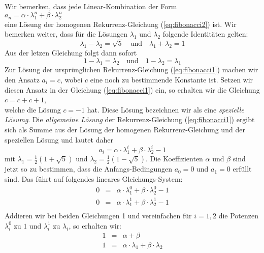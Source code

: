 Wir bemerken, dass jede Linear-Kombination der Form
\\[0.2cm]
\hspace*{1.3cm}
$a_n = \alpha \cdot \lambda_1^n + \beta \cdot \lambda_2^n$
\\[0.2cm]
eine L\"{o}sung der homogenen Rekurrenz-Gleichung (\ref{eq:fibonacci2}) ist.
Wir bemerken weiter, dass f\"{u}r die L\"{o}sungen $\lambda_1$ und $\lambda_2$ folgende
Identit\"{a}ten gelten:
\begin{equation}
  \label{eq:fibonacci3}
   \lambda_1 - \lambda_2 = \sqrt{5} \quad \mbox{und} \quad \lambda_1 + \lambda_2 = 1
\end{equation}
Aus der letzen Gleichung folgt dann sofort 
\begin{equation}
  \label{eq:fibonacci4}
  1 - \lambda_1 = \lambda_2 \quad \mbox{und} \quad 1 - \lambda_2 = \lambda_1 
\end{equation}
Zur L\"{o}sung der urspr\"{u}nglichen Rekurrenz-Gleichung (\ref{eq:fibonacci1}) machen wir den Ansatz 
$a_i = c$, wobei $c$ eine noch zu bestimmende Konstante ist.  
Setzen wir diesen Ansatz in der Gleichung (\ref{eq:fibonacci1}) ein, so
erhalten wir die Gleichung \\[0.2cm] 
\hspace*{1.3cm} $c = c + c + 1$, \\[0.2cm]
welche die L\"{o}sung $c = -1$ hat.  Diese L\"{o}sung bezeichnen wir als eine \emph{spezielle L\"{o}sumg}.
Die \emph{allgemeine L\"{o}sung} der Rekurrenz-Gleichung (\ref{eq:fibonacci1})
ergibt sich als Summe aus der L\"{o}sung der homogenen Rekurrenz-Gleichung und der speziellen
L\"{o}sung und lautet daher 
\[ a_i = \alpha \cdot \lambda_1^i + \beta \cdot \lambda_2^i - 1 \]
mit $\lambda_1 = \frac{1}{2} (1 + \sqrt{5})$ und $\lambda_2 = \frac{1}{2} (1 - \sqrt{5})$.
Die Koeffizienten $\alpha$ und $\beta$ sind jetzt so zu bestimmen, dass die
Anfangs-Bedingungen $a_0 = 0$ und $a_1 = 0$ erf\"{u}llt sind.  Das f\"{u}hrt auf folgendes
lineares Gleichungs-System: 
\[\begin{array}{lcl}
    0 & = & \alpha \cdot \lambda_1^0 + \beta \cdot \lambda_2^0 - 1 \\[0.2cm]
    0 & = & \alpha \cdot \lambda_1^1 + \beta \cdot \lambda_2^1 - 1 \\
  \end{array}
\]
Addieren wir bei beiden Gleichungen 1 und vereinfachen f\"{u}r $i=1,2$ die Potenzen $\lambda_i^0$ zu $1$ und
$\lambda_i^1$ zu $\lambda_i$, so erhalten wir:
\[\begin{array}{lcl}
    1 & = & \alpha + \beta \\[0.2cm]
    1 & = & \alpha \cdot \lambda_1 + \beta \cdot \lambda_2  \\
  \end{array}
\]

